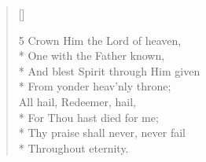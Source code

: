 \begin{verse}[\versewidth]
\begin{altverse}
\item[5]Crown Him the Lord of heaven,\\*
One with the Father known,\\*
And blest Spirit through Him given\\*
From yonder heav'nly throne;\\
All hail, Redeemer, hail,\\*
For Thou hast died for me;\\*
Thy praise shall never, never fail\\*
Throughout eternity.
\end{altverse}

\end{verse}

